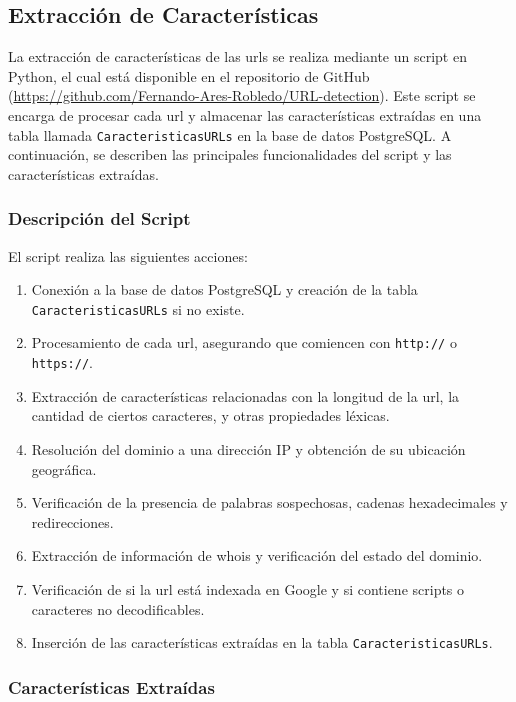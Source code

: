 \subsection{Extracción de Características}

La extracción de características de las \glspl{url} se realiza mediante un \gls{script} en Python, el cual está disponible en el repositorio de GitHub (\url{https://github.com/Fernando-Ares-Robledo/URL-detection}). Este \gls{script} se encarga de procesar cada \gls{url} y almacenar las características extraídas en una tabla llamada \texttt{CaracteristicasURLs} en la base de datos PostgreSQL. A continuación, se describen las principales funcionalidades del \gls{script} y las características extraídas.

\subsubsection*{Descripción del Script}

El \gls{script} realiza las siguientes acciones:

\begin{enumerate}
    \item Conexión a la base de datos PostgreSQL y creación de la tabla \texttt{CaracteristicasURLs} si no existe.
    \item Procesamiento de cada \gls{url}, asegurando que comiencen con \texttt{http://} o \texttt{https://}.
    \item Extracción de características relacionadas con la longitud de la \gls{url}, la cantidad de ciertos caracteres, y otras propiedades léxicas.
    \item Resolución del dominio a una dirección IP y obtención de su ubicación geográfica.
    \item Verificación de la presencia de palabras sospechosas, cadenas hexadecimales y redirecciones.
    \item Extracción de información de \gls{whois} y verificación del estado del dominio.
    \item Verificación de si la \gls{url} está indexada en Google y si contiene scripts o caracteres no decodificables.
    \item Inserción de las características extraídas en la tabla \texttt{CaracteristicasURLs}.
\end{enumerate}

\subsubsection*{Características Extraídas}

